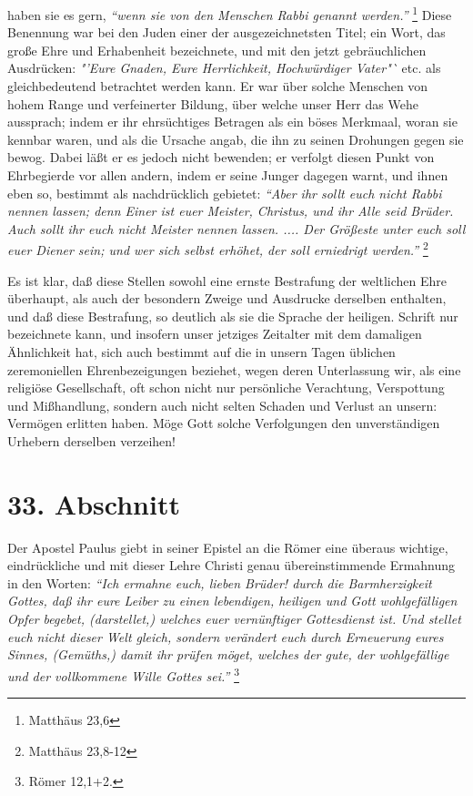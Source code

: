 haben sie es gern,
\textit{"`wenn sie von den Menschen Rabbi genannt
werden."'}
\footnote{Matthäus 23,6}
Diese Benennung war bei den Juden einer der
ausgezeichnetsten Titel; ein Wort, das große Ehre und Erhabenheit bezeichnete,
und mit den jetzt gebräuchlichen Ausdrücken: \textit{"'Eure Gnaden, Eure
Herrlichkeit, Hochwürdiger Vater"`} etc. als gleichbedeutend betrachtet werden
kann. Er war
über solche Menschen von hohem Range und verfeinerter Bildung, über welche unser
Herr das Wehe aussprach; indem er ihr ehrsüchtiges Betragen als ein böses
Merkmaal, woran sie kennbar waren, und als die Ursache angab, die ihn zu seinen
Drohungen gegen sie bewog. Dabei läßt er es jedoch nicht bewenden; er verfolgt
diesen Punkt von Ehrbegierde vor allen andern, indem er seine Junger dagegen
warnt, und ihnen eben so, bestimmt als nachdrücklich gebietet:
\textit{"`Aber ihr sollt
euch nicht Rabbi nennen lassen; denn Einer ist euer Meister, Christus, und ihr
Alle seid Brüder. Auch sollt ihr euch nicht Meister nennen lassen. .... Der
Größeste unter euch soll euer Diener sein; und wer sich selbst erhöhet, der soll
erniedrigt werden."'}
\footnote{Matthäus 23,8-12}

\medskip

Es ist klar, daß diese Stellen sowohl eine ernste Bestrafung der weltlichen Ehre
überhaupt, als auch der besondern Zweige und Ausdrucke derselben enthalten, und
daß diese Bestrafung, so deutlich als sie die Sprache der heiligen. Schrift nur
bezeichnete kann, und insofern unser jetziges Zeitalter mit dem damaligen
Ähnlichkeit hat, sich auch bestimmt auf die in unsern Tagen üblichen
zeremoniellen Ehrenbezeigungen beziehet, wegen deren Unterlassung wir, als eine
religiöse Gesellschaft, oft schon nicht nur persönliche Verachtung, Verspottung
und Mißhandlung, sondern auch nicht selten Schaden und Verlust an unsern:
Vermögen erlitten haben. Möge Gott solche Verfolgungen den unverständigen
Urhebern derselben verzeihen!

\section{33. Abschnitt} \label{kap9_ab33}

Der Apostel Paulus giebt in seiner Epistel an die Römer eine überaus wichtige,
eindrückliche und mit dieser Lehre Christi genau übereinstimmende Ermahnung in
den Worten:
\textit{"`Ich ermahne euch, lieben Brüder! durch die Barmherzigkeit Gottes,
daß ihr eure Leiber zu einen lebendigen, heiligen und Gott wohlgefälligen Opfer
begebet, (darstellet,) welches euer vernünftiger Gottesdienst ist. Und stellet
euch nicht dieser Welt gleich, sondern verändert euch durch Erneuerung eures
Sinnes, (Gemüths,) damit ihr prüfen möget, welches der gute, der wohlgefällige
und der vollkommene Wille Gottes sei."'}
\footnote{Römer 12,1+2.}

